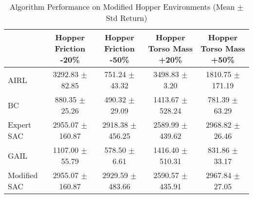 \begin{table}
\caption{Algorithm Performance on Modified Hopper Environments (Mean $\pm$ Std Return)}
\label{tab:perf_mod_hopper}
\begin{tabular}{lcccc}
\toprule
 & Hopper Friction -20\% & Hopper Friction -50\% & Hopper Torso Mass +20\% & Hopper Torso Mass +50\% \\
\midrule
AIRL & 3292.83 $\pm$ 82.85 & 751.24 $\pm$ 43.32 & 3498.83 $\pm$ 3.20 & 1810.75 $\pm$ 171.19 \\
BC & 880.35 $\pm$ 25.26 & 490.32 $\pm$ 29.09 & 1413.67 $\pm$ 528.24 & 781.39 $\pm$ 63.29 \\
Expert SAC & 2955.07 $\pm$ 160.87 & 2918.38 $\pm$ 456.25 & 2589.99 $\pm$ 439.62 & 2968.82 $\pm$ 26.46 \\
GAIL & 1107.00 $\pm$ 55.79 & 578.50 $\pm$ 6.61 & 1416.40 $\pm$ 510.31 & 831.86 $\pm$ 33.17 \\
Modified SAC & 2955.07 $\pm$ 160.87 & 2929.59 $\pm$ 483.66 & 2590.57 $\pm$ 435.91 & 2967.84 $\pm$ 27.05 \\
\bottomrule
\end{tabular}
\end{table}
